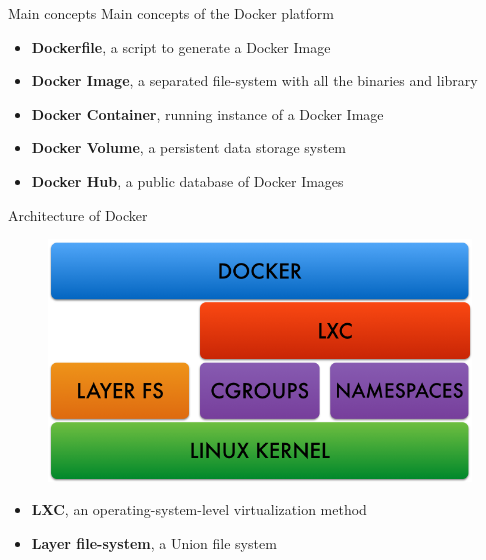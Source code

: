 \documentclass{beamer}
\begin{document}
  \begin{frame}{Main concepts}
    Main concepts of the Docker platform
    \begin{itemize}
      \item \textbf{Dockerfile}, a script to generate a Docker Image
      \item \textbf{Docker Image}, a separated file-system with all the binaries and library
      \item \textbf{Docker Container}, running instance of a Docker Image
      \item \textbf{Docker Volume}, a persistent data storage system
      \item \textbf{Docker Hub}, a public database of Docker Images
    \end{itemize}
  \end{frame}

  \begin{frame}{Architecture of Docker}
    \begin{figure}
      \includegraphics[width=.7\textwidth]{img/docker_achitecture_crop.png}
    \end{figure}
    \begin{itemize}
      \item \textbf{LXC}, an operating-system-level virtualization method
      \item \textbf{Layer file-system}, a Union file system
    \end{itemize}
  \end{frame}
\end{document}
